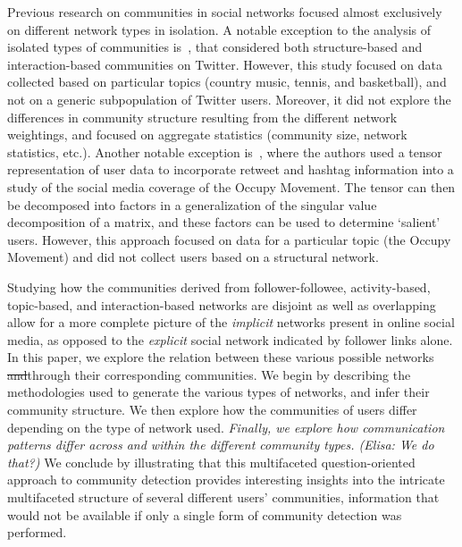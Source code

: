 Previous research on communities in social networks focused almost exclusively on different network types in isolation.
A notable exception to the analysis of isolated types of communities is~\cite{lim2012tweets}, that considered both structure-based and interaction-based communities on Twitter. However, this study focused on data collected based on particular topics (country music, tennis, and basketball), and not on a generic subpopulation of Twitter users. Moreover, it did not explore the differences in community structure resulting from the different network weightings, and focused on aggregate statistics (community size, network statistics, etc.). Another notable exception is~\cite{kao2013talison}, where the authors used a tensor representation of user data to incorporate retweet and hashtag information into a study of the social media coverage of the Occupy Movement. The tensor can then be decomposed into factors in a generalization of the singular value decomposition of a matrix, and these factors can be used to determine `salient' users. However, this approach focused on data for a particular topic (the Occupy Movement) and did not collect users based on a structural network.

Studying how the communities derived from follower-followee, activity-based, topic-based, and interaction-based networks are disjoint as well as overlapping allow for a more complete picture of the \emph{implicit} networks present in online social media, as opposed to the \emph{explicit} social network indicated by follower links alone. In this paper, we explore the relation between these various possible networks \sout{and}through their corresponding communities. We begin by describing the methodologies used to generate the various types of networks, and infer their community structure.  We then explore how the communities of users differ depending on the type of network used. \emph{Finally, we explore how communication patterns differ across and within the different community types. (Elisa: We do that?)} We conclude by illustrating that this multifaceted question-oriented approach to community detection provides interesting insights into the intricate multifaceted structure of several different users' communities, information that would not be available if only a single form of community detection was performed. 

